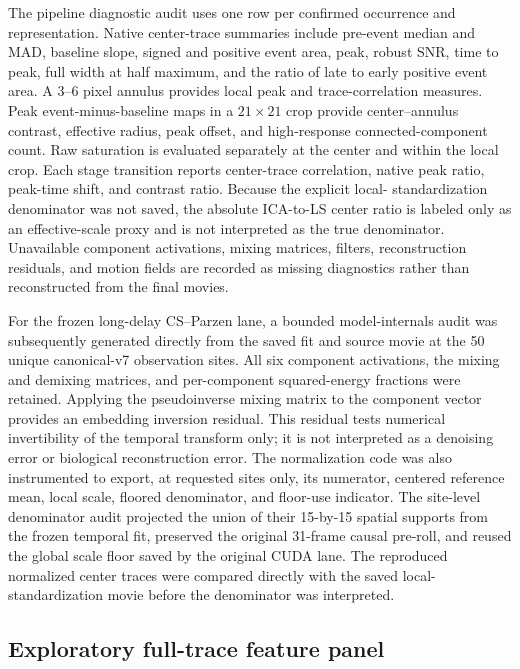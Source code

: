 The pipeline diagnostic audit uses one row per confirmed occurrence and
representation. Native center-trace summaries include pre-event median and
MAD, baseline slope, signed and positive event area, peak, robust SNR, time to
peak, full width at half maximum, and the ratio of late to early positive event
area. A 3--6 pixel annulus provides local peak and trace-correlation measures.
Peak event-minus-baseline maps in a $21\times21$ crop provide center--annulus
contrast, effective radius, peak offset, and high-response connected-component
count. Raw saturation is evaluated separately at the center and within the
local crop. Each stage transition reports center-trace correlation, native
peak ratio, peak-time shift, and contrast ratio. Because the explicit local-
standardization denominator was not saved, the absolute ICA-to-LS center ratio
is labeled only as an effective-scale proxy and is not interpreted as the true
denominator. Unavailable component activations, mixing matrices, filters,
reconstruction residuals, and motion fields are recorded as missing
diagnostics rather than reconstructed from the final movies.

For the frozen long-delay CS--Parzen lane, a bounded model-internals audit was
subsequently generated directly from the saved fit and source movie at the 50
unique canonical-v7 observation sites. All six component activations, the
mixing and demixing matrices, and per-component squared-energy fractions were
retained. Applying the pseudoinverse mixing matrix to the component vector
provides an embedding inversion residual. This residual tests numerical
invertibility of the temporal transform only; it is not interpreted as a
denoising error or biological reconstruction error. The normalization code was
also instrumented to export, at requested sites only, its numerator, centered
reference mean, local scale, floored denominator, and floor-use indicator. The
site-level denominator audit projected the union of their 15-by-15 spatial
supports from the frozen temporal fit, preserved the original 31-frame causal
pre-roll, and reused the global scale floor saved by the original CUDA lane.
The reproduced normalized center traces were compared directly with the saved
local-standardization movie before the denominator was interpreted.

\subsection{Exploratory full-trace feature panel}
\label{sec:full-trace-panel-methods}

